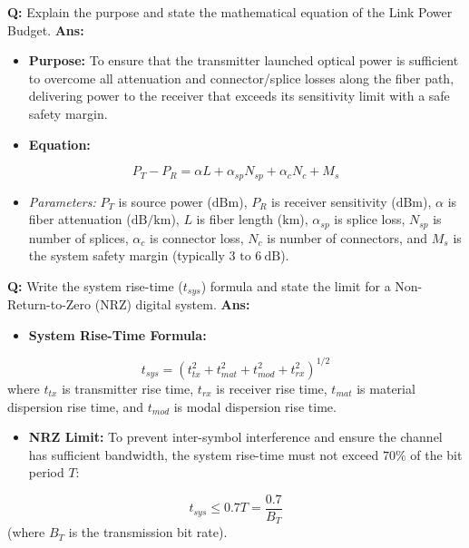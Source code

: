 \documentclass[10pt,a4paper,twocolumn]{article}
\begin{document}
\begin{tcolorbox}[
  colback=white,
  colframe=UnitColorFour,
  colbacktitle=gray!10!white,
  coltitle=black,
  fonttitle=\bfseries\sffamily\small,
  title={Unit IV $\bullet$ Card 7: Link Power Budget},
  boxrule=1.2pt,
  arc=2mm,
  outer arc=2mm,
  boxsep=1.5mm,
  top=1mm,
  bottom=1mm,
  left=1.5mm,
  right=1.5mm,
  before skip=2.5mm,
  after skip=2.5mm
]
\textbf{Q:} Explain the purpose and state the mathematical equation of the Link Power Budget.
\tcbline
\textbf{Ans:} \begin{itemize}
  \item   \textbf{Purpose:} To ensure that the transmitter launched optical power is sufficient to overcome all attenuation and connector/splice losses along the fiber path, delivering power to the receiver that exceeds its sensitivity limit with a safe safety margin.
  \item   \textbf{Equation:}
\end{itemize}
        \[ P_T - P_R = \alpha L + \alpha_{sp} N_{sp} + \alpha_c N_c + M_s \]
\begin{itemize}
  \item   \textit{Parameters:} $P_T$ is source power ($\text{dBm}$), $P_R$ is receiver sensitivity ($\text{dBm}$), $\alpha$ is fiber attenuation ($\text{dB/km}$), $L$ is fiber length ($\text{km}$), $\alpha_{sp}$ is splice loss, $N_{sp}$ is number of splices, $\alpha_c$ is connector loss, $N_c$ is number of connectors, and $M_s$ is the system safety margin (typically $3 \text{ to } 6\ \text{dB}$).
\end{itemize}
\end{tcolorbox}


\begin{tcolorbox}[
  colback=white,
  colframe=UnitColorFour,
  colbacktitle=gray!10!white,
  coltitle=black,
  fonttitle=\bfseries\sffamily\small,
  title={Unit IV $\bullet$ Card 8: Rise-Time Budget},
  boxrule=1.2pt,
  arc=2mm,
  outer arc=2mm,
  boxsep=1.5mm,
  top=1mm,
  bottom=1mm,
  left=1.5mm,
  right=1.5mm,
  before skip=2.5mm,
  after skip=2.5mm
]
\textbf{Q:} Write the system rise-time ($t_{sys}$) formula and state the limit for a Non-Return-to-Zero (NRZ) digital system.
\tcbline
\textbf{Ans:} \begin{itemize}
  \item   \textbf{System Rise-Time Formula:}
\end{itemize}
        \[ t_{sys} = \left( t_{tx}^2 + t_{mat}^2 + t_{mod}^2 + t_{rx}^2 \right)^{1/2} \]
        where $t_{tx}$ is transmitter rise time, $t_{rx}$ is receiver rise time, $t_{mat}$ is material dispersion rise time, and $t_{mod}$ is modal dispersion rise time.
\begin{itemize}
  \item   \textbf{NRZ Limit:} To prevent inter-symbol interference and ensure the channel has sufficient bandwidth, the system rise-time must not exceed $70\%$ of the bit period $T$:
\end{itemize}
        \[ t_{sys} \le 0.7 T = \frac{0.7}{B_T} \] (where $B_T$ is the transmission bit rate).
\end{tcolorbox}
\end{document}

